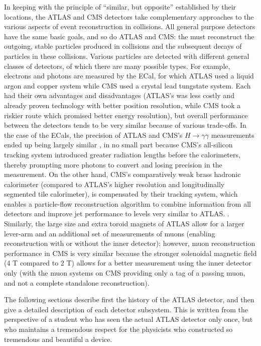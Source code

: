 In keeping with the principle of ``similar, but opposite'' established by their locations, the ATLAS and CMS detectors take complementary approaches to the various aspects of event reconstruction in collisions. All general purpose detectors have the same basic goals, and so do ATLAS and CMS: the must reconstruct the outgoing, stable particles produced in collisions and the subsequent decays of particles in these collisions. Various particles are detected with different general classes of detectors, of which there are many possible types. For example, electrons and photons are measured by the ECal, for which ATLAS used a liquid argon and copper system while CMS used a crystal lead tungstate system. Each had their own advantages and disadvantages (ATLAS's was less costly and already proven technology with better position resolution, while CMS took a riskier route which promised better energy resolution), but overall performance between the detectors tends to be very similar because of various trade-offs. In the case of the ECals, the precision of ATLAS and CMS's $H\rightarrow \gamma \gamma$ measurements ended up being largely similar , in no small part because CMS's all-silicon tracking system introduced greater radiation lengths before the calorimeters, thereby prompting more photons to convert and losing precision in the measurement. On the other hand, CMS's comparatively weak brass hadronic calorimeter (compared to ATLAS's higher resolution and longitudinally segmented tile calorimeter), is compensated by their tracking system, which enables a particle-flow reconstruction algorithm to combine information from all detectors and improve jet performance to levels very similar to ATLAS. . Similarly, the large size and extra toroid magnets of ATLAS allow for a larger lever-arm and an additional set of measurements of muons (enabling reconstruction with or without the inner detector): however, muon reconstruction performance in CMS is very similar because the stronger solenoidal magnetic field (4 T compared to 2 T) allows for a better measurement using the inner detector only (with the muon systems on CMS providing only a tag of a passing muon, and not a complete standalone reconstruction). 



The following sections describe first the history of the ATLAS detector, and then give a detailed description of each detector subsystem. This is written from the perspective of a student who has seen the actual ATLAS detector only once, but who maintains a tremendous respect for the physicists who constructed so tremendous and beautiful a device.

